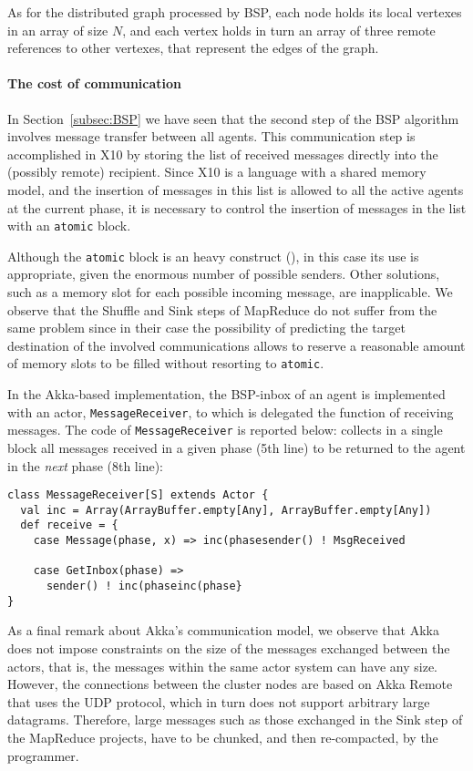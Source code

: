 \documentclass[a4paper]{article}
\numberwithin{equation}{section}
\begin{document}
As for the distributed graph processed by BSP, each node holds its
local vertexes in an array of size $N$, and
each vertex holds in turn an array of three remote references
to other vertexes, that represent the edges of the graph.

\paragraph{The cost of communication}
In Section~\ref{subsec:BSP} we have seen that the second step of the
BSP algorithm involves message transfer between all agents.
This communication step is accomplished in X10 by storing the list of
received messages directly into the (possibly remote) recipient. 
Since X10 is a language with a shared memory model, and the insertion
of messages in this list is allowed to all the active agents at the
current phase, it is necessary to control the insertion of messages in
the list with an \verb+atomic+ block. 

Although the \verb+atomic+ block is an heavy construct 
(\cite{X10-Brief}), in this case
its use is appropriate, given the enormous number of possible
senders. Other solutions, such as a memory slot for each possible
incoming message, are inapplicable. We observe that the Shuffle and
Sink steps of MapReduce do not suffer from the same problem since 
in their case the possibility of predicting the target destination of
the involved communications allows to reserve a reasonable amount of
memory slots to be filled without resorting to
\verb+atomic+.

In the Akka-based implementation, the BSP-inbox of an agent is
implemented with an actor, \verb+MessageReceiver+, to which is
delegated the function of receiving messages. 
The code of \verb+MessageReceiver+ is reported below: 
collects in a single block all messages received in a given phase 
(5th line) to be returned to the agent in the \emph{next} phase (8th
line): 
{\small
\begin{verbatim}
class MessageReceiver[S] extends Actor {
  val inc = Array(ArrayBuffer.empty[Any], ArrayBuffer.empty[Any])
  def receive = {
    case Message(phase, x) => inc(phasesender() ! MsgReceived

    case GetInbox(phase) =>
      sender() ! inc(phaseinc(phase}
}
\end{verbatim}
}


As a final remark about Akka's communication model, we observe that
Akka does not impose constraints on the size of the messages exchanged
between the actors, that is, the messages within the same actor system
can have any size. However, the connections between the cluster
nodes are based on Akka Remote that uses the UDP protocol, which in
turn does not support arbitrary large datagrams. Therefore, 
large messages such as those exchanged in the Sink step of the
MapReduce projects, have to be chunked, and then re-compacted, by the
programmer.
\end{document}
